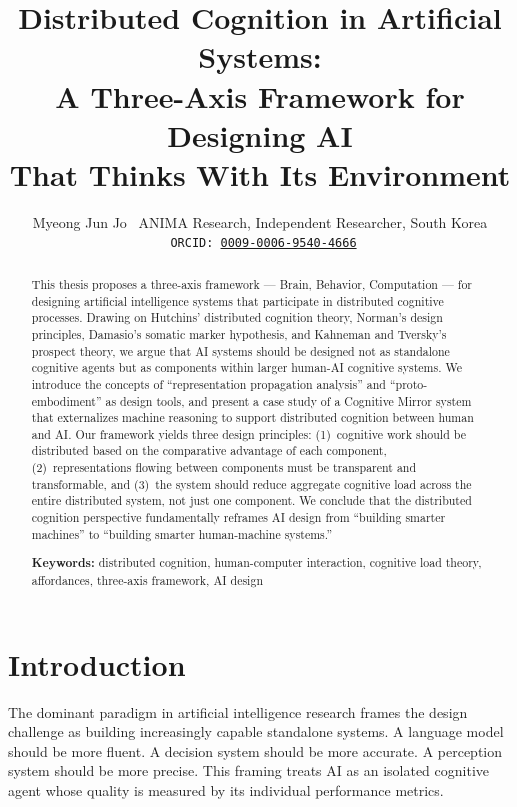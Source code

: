 \documentclass[11pt,a4paper]{article}
\title{%
  \textbf{Distributed Cognition in Artificial Systems:\\
  A Three-Axis Framework for Designing AI\\
  That Thinks With Its Environment}
}
\author{%
  Myeong Jun Jo \
  ANIMA Research, Independent Researcher, South Korea \
  \texttt{ORCID: \href{https://orcid.org/0009-0006-9540-4666}{0009-0006-9540-4666}}
}
\date{}
\begin{document}
\maketitle

\begin{abstract}
This thesis proposes a three-axis framework --- Brain, Behavior, Computation --- for designing artificial intelligence systems that participate in distributed cognitive processes. Drawing on Hutchins' distributed cognition theory, Norman's design principles, Damasio's somatic marker hypothesis, and Kahneman and Tversky's prospect theory, we argue that AI systems should be designed not as standalone cognitive agents but as components within larger human-AI cognitive systems. We introduce the concepts of ``representation propagation analysis'' and ``proto-embodiment'' as design tools, and present a case study of a Cognitive Mirror system that externalizes machine reasoning to support distributed cognition between human and AI. Our framework yields three design principles: (1)~cognitive work should be distributed based on the comparative advantage of each component, (2)~representations flowing between components must be transparent and transformable, and (3)~the system should reduce aggregate cognitive load across the entire distributed system, not just one component. We conclude that the distributed cognition perspective fundamentally reframes AI design from ``building smarter machines'' to ``building smarter human-machine systems.''

\vspace{6pt}
\noindent\textbf{Keywords:} distributed cognition, human-computer interaction, cognitive load theory, affordances, three-axis framework, AI design
\end{abstract}

\section{Introduction}

The dominant paradigm in artificial intelligence research frames the design challenge as building increasingly capable standalone systems. A language model should be more fluent. A decision system should be more accurate. A perception system should be more precise. This framing treats AI as an isolated cognitive agent whose quality is measured by its individual performance metrics.
\end{document}
